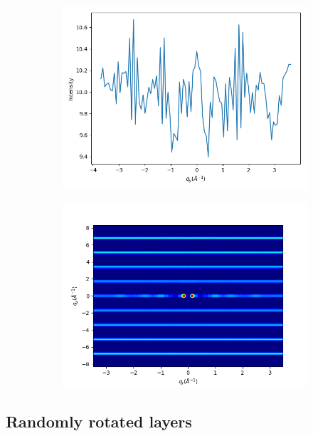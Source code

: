 \documentclass{article}
\begin{document}
  \begin{figure}[!htb]
  \centering
  \begin{subfigure}{0.45\textwidth}
  \includegraphics[width=\textwidth]{random_columns_qy.png}
  \caption{}\label{fig:random_columns_qy}
  \end{subfigure}
  \begin{subfigure}{0.45\textwidth}
  \includegraphics[width=\textwidth]{random_columns_rzplot.png}
  \caption{}\label{fig:random_columns_rzplot}
  \end{subfigure}
  \caption{}\label{fig:random_columns_rpi_width}
  \end{figure}

  \subsection{Randomly rotated layers}
\end{document}
